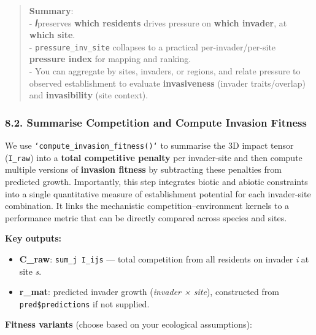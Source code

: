 \documentclass[
]{article}
\providecommand{\tightlist}{%
  \setlength{\itemsep}{0pt}\setlength{\parskip}{0pt}}
\begin{document}
\begin{quote}
\textbf{Summary}:\\
- \textbf{𝐼}preserves \textbf{which residents} drives pressure on
\textbf{which invader}, at \textbf{which site}.\\
- \texttt{pressure\_inv\_site} collapses to a practical
per-invader/per-site \textbf{pressure index} for mapping and ranking.\\
- You can aggregate by sites, invaders, or regions, and relate pressure
to observed establishment to evaluate \textbf{invasiveness} (invader
traits/overlap) and \textbf{invasibility} (site context).
\end{quote}

\hypertarget{summarise-competition-and-compute-invasion-fitness}{%
\subsubsection{8.2. Summarise Competition and Compute Invasion
Fitness}\label{summarise-competition-and-compute-invasion-fitness}}

We use \texttt{`compute_invasion_fitness()`} to summarise the 3D impact
tensor (\texttt{I\_raw}) into a \textbf{total competitive penalty} per
invader-site and then compute multiple versions of \textbf{invasion
fitness} by subtracting these penalties from predicted growth.
Importantly, this step integrates biotic and abiotic constraints into a
single quantitative measure of establishment potential for each
invader-site combination. It links the mechanistic
competition--environment kernels to a performance metric that can be
directly compared across species and sites.

\textbf{Key outputs:}

\begin{itemize}
\tightlist
\item
  \textbf{C\_raw}: \texttt{sum\_j\ I\_ijs} --- total competition from
  all residents on invader \emph{i} at site \emph{s}.\\
\item
  \textbf{r\_mat}: predicted invader growth (\emph{invader × site}),
  constructed from \texttt{pred\$predictions} if not supplied.
\end{itemize}

\textbf{Fitness variants} (choose based on your ecological assumptions):
\end{document}

